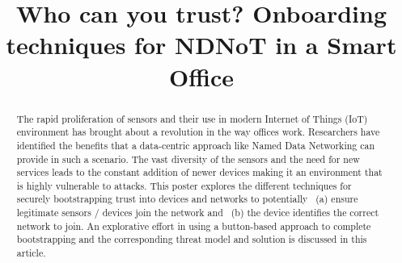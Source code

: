 \documentclass[10pt,sigconf]{acmart}
\begin{document}
\title{Who can you trust? \linebreak Onboarding techniques for NDNoT in a Smart Office }









\begin{abstract}

  The rapid proliferation of sensors and their use in modern Internet of Things (IoT) environment has brought about a revolution in the way offices work.
  Researchers have identified the benefits that a data-centric approach like Named Data Networking can provide in such a scenario.
  The vast diversity of the sensors and the need for new services leads to the constant addition of newer devices making it an environment that is highly vulnerable to attacks. 
  This poster explores the different techniques for securely bootstrapping trust into devices and networks to potentially ~(a) ensure legitimate sensors / devices join the network and ~(b) the device identifies the correct network to join.
  An explorative effort in using a button-based approach to complete bootstrapping and the corresponding threat model and solution is discussed in this article.
  
\end{abstract}
\end{document}
